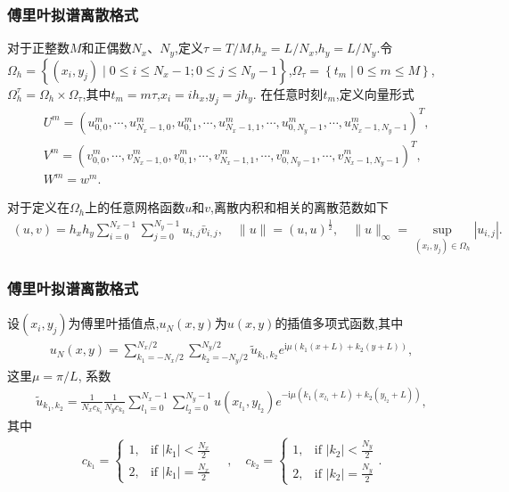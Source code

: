 \documentclass[aspectratio=169]{beamer}
\numberwithin{theorem}{section} %
\begin{document}
\begin{frame}\frametitle{傅里叶拟谱离散格式}
	对于正整数$M$和正偶数$N_{x}$、$N_{y}$,定义$\tau={T}/{M}$,$h_{x}={L}/{N_{x}}$,$h_{y}={L}/{N_{y}}$.令$\Omega_{h}=\left\{(x_{i}, y_{j}) \mid 0 \leq i \leq N_x-1;0 \leq j \leq N_y-1\right\}$,$\Omega_{\tau}=\left\{t_{m} \mid 0 \leq m \leq M\right\}$,$\Omega_{h}^{\tau}=\Omega_{h} \times \Omega_{\tau}$,其中$t_{m}=m \tau$,$x_{i}=i h_{x}$,$y_{j}=j h_{y}$.
	在任意时刻$t_m$,定义向量形式
	\begin{align}\label{eq_SAVRRK:47}
	&U^m=\left(u_{0,0}^m, \cdots, u_{N_{x}-1,0}^m, u_{0,1}^m, \cdots, u_{N_{x}-1,1}^m, \cdots, u_{0, N_{y}-1}^m, \cdots, u_{N_{x}-1, N_{y}-1}^m\right)^{T},\\
	&V^m=\left(v_{0,0}^m, \cdots, v_{N_{x}-1,0}^m, v_{0,1}^m, \cdots, v_{N_{x}-1,1}^m, \cdots, v_{0, N_{y}-1}^m, \cdots, v_{N_{x}-1, N_{y}-1}^m\right)^{T},\\
	&W^m=w^m.
	\end{align}
	
	对于定义在$\Omega_{h}$上的任意网格函数$u$和$v$,离散内积和相关的离散范数如下
	\begin{align}\label{eq_SAVRRK:48}
	(u, v)=h_{x} h_{y} \sum_{i=0}^{N_{x}-1} \sum_{j=0}^{N_{y}-1} u_{i, j} \bar{v}_{i, j},\quad\|u\|=(u, u)^{\frac{1}{2}},\quad\|u\|_{\infty}=\sup _{\left(x_{i}, y_{j}\right) \in \Omega_{h}}\left|u_{i, j}\right|.
	\end{align}
	
\end{frame}


\begin{frame}\frametitle{傅里叶拟谱离散格式}
	设$\left(x_{i}, y_{j}\right)$为傅里叶插值点,$u_{N}(x, y)$为$u(x, y)$的插值多项式函数,其中
\begin{align}\label{eq_SAVRRK:50}
u_{N}(x, y)=\sum_{k_{1}=-N_{x} / 2}^{N_{x} / 2} \sum_{k_{2}=-N_{y} / 2}^{N_{y} / 2} \tilde{u}_{k_{1}, k_{2}} e^{\mathrm{i}\mu\left( k_{1} (x+L)+k_{2}(y+L)\right)},
\end{align}
这里$\mu={\pi}/{L}$, 系数
\begin{align}\label{eq_SAVRRK:51}
\tilde{u}_{k_{1}, k_{2}}=\frac{1}{N_{x} c_{k_{1}}} \frac{1}{N_{y} c_{k_{2}}} \sum_{l_1=0}^{N_{x}-1} \sum_{l_2=0}^{N_{y}-1} u(x_{l_1}, y_{l_2}) e^{-\mathrm{i}\mu\left( k_{1}(x_{l_1}+L)+k_{2}(y_{l_2}+L)\right)},
\end{align}
其中
\begin{align}c_{k_1} = \begin{cases} 1, & \text{if } |k_1| < \frac{N_x}{2} \\ 2, & \text{if } |k_1| = \frac{N_x}{2} \end{cases} \quad , \quad c_{k_2} = \begin{cases} 1, & \text{if } |k_2| < \frac{N_y}{2} \\ 2, & \text{if } |k_2| = \frac{N_y}{2} \end{cases}.\end{align}

\end{frame}
\end{document}
